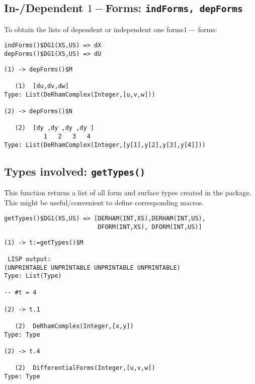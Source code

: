 \documentclass[12pt,a4paper]{article}
\begin{document}
\subsection{In-/Dependent $1-$Forms: {\tt indForms, depForms}}
To obtain the lists of dependent or independent one forms$1-$ forms:
\begin{lstlisting}
indForms()$DG1(XS,US) => dX
depForms()$DG1(XS,US) => dU
\end{lstlisting}
\scriptsize
\begin{verbatim}
(1) -> depForms()$M

   (1)  [du,dv,dw]
Type: List(DeRhamComplex(Integer,[u,v,w]))

(2) -> depForms()$N

   (2)  [dy ,dy ,dy ,dy ]
           1   2   3   4
Type: List(DeRhamComplex(Integer,[y[1],y[2],y[3],y[4]]))
\end{verbatim}
\normalsize
%
\subsection{Types involved: {\tt getTypes()}}
This function returns a list of all form and surface types created 
in the package. This might be useful/convenient to define 
corresponding macros.
\begin{lstlisting}
getTypes()$DG1(XS,US) => [DERHAM(INT,XS),DERHAM(INT,US),
                          DFORM(INT,XS), DFORM(INT,US)]
\end{lstlisting}
\scriptsize
\begin{verbatim}
(1) -> t:=getTypes()$M

 LISP output:
(UNPRINTABLE UNPRINTABLE UNPRINTABLE UNPRINTABLE)
Type: List(Type)

-- #t = 4

(2) -> t.1

   (2)  DeRhamComplex(Integer,[x,y])
Type: Type 

(2) -> t.4

   (2)  DifferentialForms(Integer,[u,v,w])
Type: Type
\end{verbatim}
\normalsize
%
\end{document}
